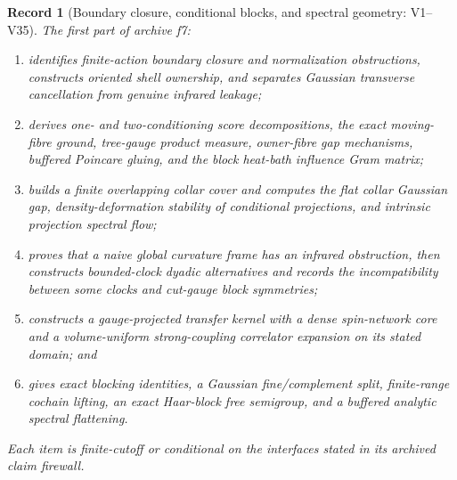 \documentclass[11pt,oneside]{book}
\newtheorem{record}[theorem]{Record}
\theoremstyle{definition}
\theoremstyle{remark}
\begin{document}
\begin{record}[Boundary closure, conditional blocks, and spectral
geometry: V1--V35]
\label{rec:e8v1-v1-v35}
The first part of archive f7:
\begin{enumerate}[label=\textup{(\roman*)},leftmargin=3.5em]
\item identifies finite-action boundary closure and normalization
      obstructions, constructs oriented shell ownership, and separates
      Gaussian transverse cancellation from genuine infrared leakage;
\item derives one- and two-conditioning score decompositions, the exact
      moving-fibre ground, tree-gauge product measure, owner-fibre gap
      mechanisms, buffered Poincare gluing, and the block heat-bath
      influence Gram matrix;
\item builds a finite overlapping collar cover and computes the flat
      collar Gaussian gap, density-deformation stability of conditional
      projections, and intrinsic projection spectral flow;
\item proves that a naive global curvature frame has an infrared
      obstruction, then constructs bounded-clock dyadic alternatives
      and records the incompatibility between some clocks and
      cut-gauge block symmetries;
\item constructs a gauge-projected transfer kernel with a dense
      spin-network core and a volume-uniform strong-coupling correlator
      expansion on its stated domain; and
\item gives exact blocking identities, a Gaussian fine/complement
      split, finite-range cochain lifting, an exact Haar-block free
      semigroup, and a buffered analytic spectral flattening.
\end{enumerate}
Each item is finite-cutoff or conditional on the interfaces stated in
its archived claim firewall.
\end{record}
\end{document}
